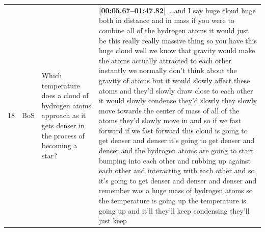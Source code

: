 \documentclass[10pt]{article}
\begin{document}
\begin{tiny}
\begin{longtable}{r p{0.3in} p{1.212in} p{3.8in}}
    18 &          BoS &                                                                                                                                                                   Which temperature does a cloud of hydrogen atoms approach as it gets denser in the process of becoming a star? &                                                                                                                                                                                                                                                                                                                                                                                                                                                                                                                                                                                                                                                                                                                                                                                                                                                                                                                                                                                                                                                                                                                                                                                                                                                                                                                                                                                                                                                                                                                                                                                                                                                                                                                                                                                                                                                                                                                                                                                                            \textbf{[00:05.67--01:47.82]}~\ldots and I say huge cloud huge both in distance and in mass if you were to combine all of the hydrogen atoms it would just be this really really massive thing so you have this huge cloud well we know that gravity would make the atoms actually attracted to each other instantly we normally don't think about the gravity of atoms but it would slowly affect these atoms and they'd slowly draw close to each other it would slowly condense they'd slowly they slowly move towards the center of mass of all of the atoms they'd slowly move in and so if we fast forward if we fast forward this cloud is going to get denser and denser it's going to get denser and denser and the hydrogen atoms are going to start bumping into each other and rubbing up against each other and interacting with each other and so it's going to get denser and denser and denser and remember was a huge mass of hydrogen atoms so the temperature is going up the temperature is going up and it'll they'll keep condensing they'll just keep 
\end{longtable}
\end{tiny}
\end{document}
